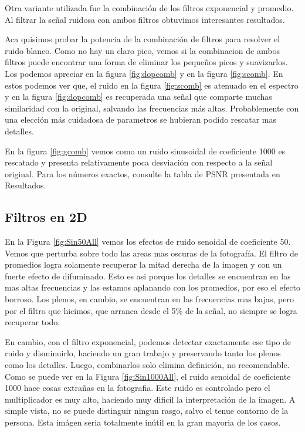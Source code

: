 Otra variante utilizada fue la combinaci\'on de los filtros exponencial y
promedio. Al filtrar la se\~nal ruidosa con ambos filtros obtuvimos interesantes
resultados.

Aca quisimos probar la potencia de la combinaci\'on de filtros para resolver
el ruido blanco. Como no hay un claro pico, vemos si la combinacion de ambos
filtros puede encontrar una forma de eliminar los peque\~nos picos y suavizarlos.
Los podemos apreciar en la figura \ref{fig:dopcomb} y en la figura \ref{fig:scomb}.
En estos podemos ver que, el ruido en la figura \ref{fig:scomb} es atenuado
en el espectro y en la figura \ref{fig:dopcomb} es recuperada una se\~nal que
comparte muchas similaridad con la original, salvando las frecuencias
m\'as altas. Probablemente con una elecci\'on m\'as cuidadosa de parametros
se hubieran podido rescatar mas detalles.

En la figura \ref{fig:gcomb} vemos como un ruido sinusoidal de coeficiente 1000
es rescatado y presenta relativamente poca desviaci\'on con respecto
a la se\~nal original. Para los n\'umeros exactos, consulte la tabla de
PSNR presentada en Resultados.

\subsection{Filtros en 2D}


En la Figura \ref{fig:Sin50All} vemos los efectos de ruido senoidal
de coeficiente 50. Vemos que perturba sobre todo las areas mas oscuras
de la fotograf\'ia. El filtro de promedios logra solamente recuperar la mitad
derecha de la imagen y con un fuerte efecto de difuminado.
Esto es asi porque los detalles se encuentran en las mas altas frecuencias
y las estamos aplanando con los promedios, por eso el efecto borroso.
Los plenos, en cambio, se encuentran en las frecuencias mas bajas, pero
por el filtro que hicimos, que arranca desde el 5\% de la señal,
no siempre se logra recuperar todo.

En cambio, con el filtro exponencial, podemos detectar exactamente ese
tipo de ruido y disminuirlo, haciendo un gran trabajo y preservando tanto
los plenos como los detalles. Luego, combinarlos solo elimina definici\'on,
no recomendable.\\


Como se puede ver en la Figura \ref{fig:Sin1000All}, el ruido senoidal
de coeficiente 1000 hace cosas extrañas en la fotografia.
Este ruido es controlado pero el multiplicador es muy alto, haciendo muy 
dificil la interpretaci\'on de la imagen. A simple vista, no se puede distinguir ningun rasgo,
salvo el tenue contorno de la persona.
Esta im\'agen seria totalmente in\'util en la gran mayoria de los casos.


